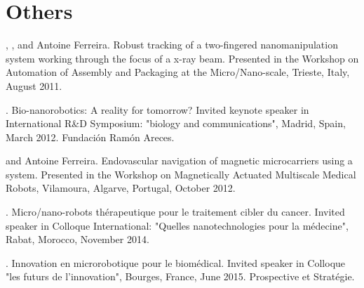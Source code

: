 \section{Others}

\begin{Mybibliography}{10}
  \NAmari, \DavidFolio, and Antoine Ferreira.
  \newblock Robust tracking of a two-fingered nanomanipulation system working
  through the focus of a x-ray beam.
  \newblock Presented in the Workshop on Automation of Assembly and Packaging at
  the Micro/Nano-scale, Trieste, Italy, August 2011.
  
  \DavidFolio.
  \newblock Bio-nanorobotics: A reality for tomorrow?
  \newblock Invited keynote speaker in International R\&D Symposium: "biology and
  communications", Madrid, Spain, March 2012.
  \newblock Fundación Ramón Areces.
  
  
  \DavidFolio and Antoine Ferreira.
  \newblock Endovascular navigation of magnetic microcarriers using a {\MRI}
  system.
  \newblock Presented in the Workshop on Magnetically Actuated Multiscale Medical
  Robots, Vilamoura, Algarve, Portugal, October 2012.
  
  \DavidFolio.
  \newblock Micro/nano-robots thérapeutique pour le traitement cibler du cancer.
  \newblock Invited speaker in Colloque International: "Quelles nanotechnologies
  pour la m\'edecine", Rabat, Morocco, November 2014.
  
  \DavidFolio.
  \newblock Innovation en microrobotique pour le biomédical.
  \newblock Invited speaker in Colloque "les futurs de l'innovation", Bourges, France, June 2015.
  \newblock Prospective et Stratégie.
\end{Mybibliography}
  